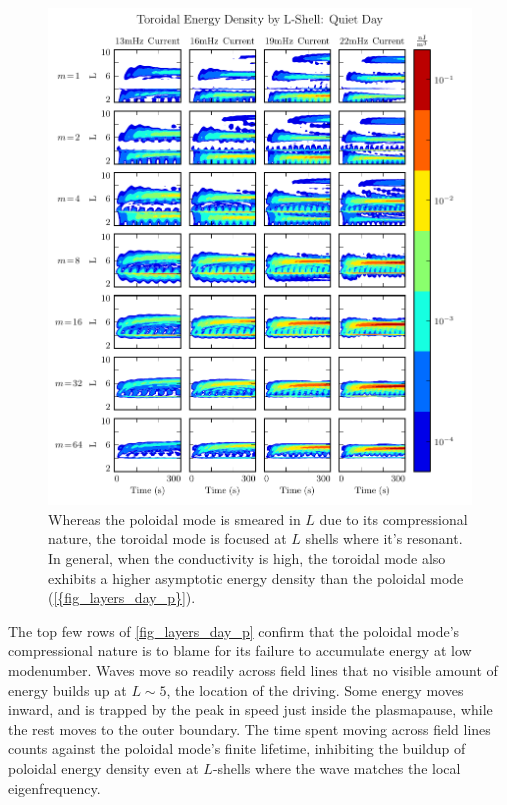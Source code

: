 \begin{figure}[!htb]
  \centering
  \includegraphics[width=\textwidth]{figures/layers_day_t.pdf}
  \caption[Dayside Toroidal Energy Distribution]{
    Whereas the poloidal mode is smeared in $L$ due to its compressional
    nature, the toroidal mode is focused at $L$ shells where it's resonant. In
    general, when the conductivity is high, the toroidal mode also exhibits a
    higher asymptotic energy density than the poloidal mode
    (\cref{{fig_layers_day_p}}). 
  }
  \label{fig_layers_day_t}
\end{figure}

The top few rows of \cref{fig_layers_day_p} confirm that the poloidal mode's
compressional nature is to blame for its failure to accumulate energy at low
modenumber. Waves move so readily across field lines that no visible amount of
energy builds up at $L \sim 5$, the location of the driving. Some energy moves
inward, and is trapped by the peak in \Alfven speed just inside the
plasmapause, while the rest moves to the outer boundary. The time spent moving
across field lines counts against the poloidal mode's finite lifetime,
inhibiting the buildup of poloidal energy density even at $L$-shells where the
wave matches the local eigenfrequency. 

